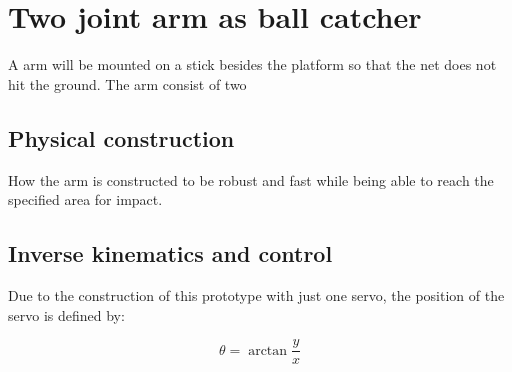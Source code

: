 \chapter{Two joint arm as ball catcher}
\label{catcherArm}
	A arm will be mounted on a stick besides the platform so that the net does not hit the ground. The arm consist of two

	\section{Physical construction}
	\label{armConstruction}
		How the arm is constructed to be robust and fast while being able to reach the specified area for impact.


	\section{Inverse kinematics and control}
	\label{kinematics}
		Due to the construction of this prototype with just one servo, the position of the servo is defined by:

		$$\theta = \arctan\frac{y}{x}$$


